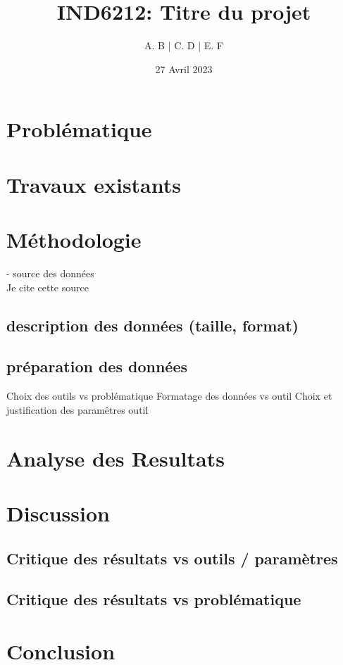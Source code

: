 \documentclass[12pt]{article}
\title{IND6212: Titre du projet}
\author{A. B | C. D | E. F}
\date{27 Avril 2023}
\begin{document}
\maketitle

\section{Problématique}
\blindtext[3]
\section{Travaux existants}
\blindtext[1]
\section{Méthodologie}
- source des données \\
Je cite cette source \cite{example-article}\\
\subsection{description des données (taille, format)}
\subsection{préparation des données}

Choix des outils vs problématique
Formatage des données vs outil
Choix et justification des paramêtres outil

\blindtext[3]
\section{Analyse des Resultats}
\blindtext[6]
\section{Discussion}
\subsection{Critique des résultats vs outils / paramètres}
\subsection{Critique des résultats vs problématique}
\blindtext[3]
\section{Conclusion}
\blindtext[1]

\setcounter{biburlnumpenalty}{7000}
\setcounter{biburllcpenalty}{7000}
\setcounter{biburlucpenalty}{7000}

\printbibliography[heading=bibintoc,title=References]
\end{document}
